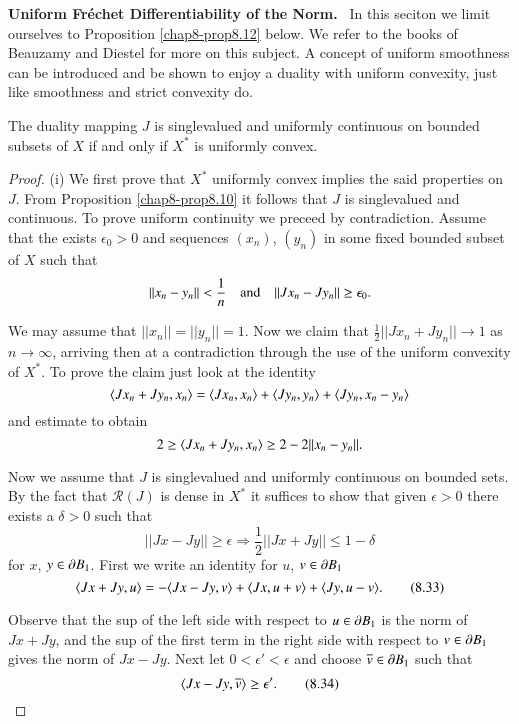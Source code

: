 \noindent
{\bf Uniform Fr\'echet Differentiability of the Norm.}~ In this
seciton we limit ourselves to Proposition \ref{chap8-prop8.12}
below. We refer to the books of Beauzamy \cite{key8} and Diestel
\cite{key32} for more on this subject. A concept of uniform smoothness
can be introduced and be shown to enjoy a duality with uniform
convexity, just like smoothness and strict convexity do.

\begin{proposition}\label{chap8-prop8.12}
The duality mapping $J$ is singlevalued and uniformly continuous on
bounded subsets of $X$ if and only if $X^{*}$ is uniformly convex. 
\end{proposition}

\begin{proof}
(i) We first prove that $X^{*}$ uniformly convex implies the said
  properties on $J$. From Proposition \ref{chap8-prop8.10} it follows
  that $J$ is singlevalued and continuous. To prove uniform continuity
  we preceed by contradiction. Assume that the exists $\epsilon_{0}>0$
  and sequences $(x_{n})$, $(y_{n})$ in some fixed bounded subset of
  $X$ such that
$$
||x_{n}-y_{n}||<\frac{1}{n}\quad \text{and}\quad ||Jx_{n}-Jy_{n}||\geq
\epsilon_{0}. 
$$

We may assume that $||x_{n}||=||y_{n}||=1$. Now we claim that
$\frac{1}{2}||Jx_{n}+Jy_{n}||\to 1$ as $n\to \infty$, arriving then at
a contradiction through the use of the uniform convexity\pageoriginale
of $X^{*}$. To prove the claim just look at the identity
$$
\langle Jx_{n}+Jy_{n},x_{n}\rangle=\langle Jx_{n},x_{n}\rangle+\langle Jy_{n},y_{n}\rangle+\langle
Jy_{n},x_{n}-y_{n}\rangle 
$$
and estimate to obtain
$$
2\geq \langle Jx_{n}+Jy_{n},x_{n}\rangle\geq 2-2||x_{n}-y_{n}||.
$$

Now we assume that $J$ is singlevalued and uniformly continuous on
bounded sets. By the fact that $\mathcal{R}(J)$ is dense in $X^{*}$ it
suffices to show that given $\epsilon>0$ there exists a $\delta>0$
such that
\begin{equation*}
||Jx-Jy||\geq \epsilon\Rightarrow \frac{1}{2}||Jx+Jy||\leq
1-\delta\tag{8.32}\label{chap8-eq8.32} 
\end{equation*}
for $x$, $y\in \partial B_{1}$. First we write an identity for $u$, $v\in \partial
B_{1}$ 
\begin{equation*}
\langle Jx+Jy,u\rangle=-\langle Jx-Jy,v\rangle+\langle Jx,u+v\rangle+\langle Jy,
u-v\rangle.\tag{8.33}\label{chap8-eq8.33} 
\end{equation*}

Observe that the sup of the left side with respect to $u\in \partial B_{1}$
is the norm of $Jx+Jy$, and the sup of the first term in the right
side with respect to $v\in \partial B_{1}$ gives the norm of $Jx-Jy$. Next
let $0<\epsilon'<\epsilon$ and choose $\overline{v}\in \partial B_{1}$ such
that
\begin{equation*}
\langle Jx-Jy,\overline{v}\rangle\geq \epsilon'.\tag{8.34}\label{chap8-eq8.34}
\end{equation*}


\end{proof}
